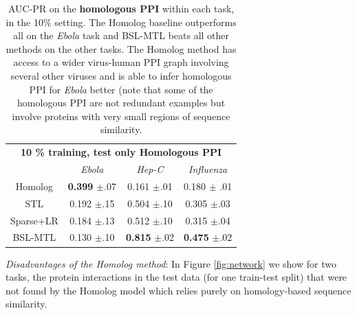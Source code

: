 \documentclass{bioinfo}
\begin{document}
\begin{table}[!h]
\caption{AUC-PR on the \textbf{homologous PPI} within each task, in the 10\% setting. The Homolog baseline outperforms all on the \textit{Ebola} task and BSL-MTL beats all other methods on the other tasks. The Homolog method has access to a wider virus-human PPI graph involving several other viruses and is able to infer homologous PPI for \textit{Ebola} better (note that some of the homologous PPI are not redundant examples but involve proteins with very small regions of sequence similarity.}
\label{homresultsTable}
\begin{small}
\begin{center}
\begin{tabular}{c|ccc}
\toprule
\multicolumn{4}{c}{\textbf{10 \% training, test only Homologous PPI }} \\
& \textit{Ebola} & \textit{Hep-C} & \textit{Influenza} \\ \midrule
Homolog & \textbf{0.399} $\pm$.07 & 0.161 $\pm$.01 & 0.180 $\pm$ .01 \\
STL   & 0.192 $\pm$.15 & 0.504 $\pm$.10 & 0.305 $\pm$.03 \\
Sparse+LR & 0.184 $\pm$.13 & 0.512 $\pm$.10 & 0.315 $\pm$.04 \\ 
BSL-MTL & 0.130 $\pm$.10 & \textbf{0.815} $\pm$.02 & \textbf{0.475} $\pm$.02 \\ \bottomrule
\end{tabular}
\end{center}
\end{small}
\end{table}


\noindent\textit{Disadvantages of the Homolog method}:
In Figure \ref{fig:network} we show for two tasks, the protein interactions in the test data (for one train-test split) that were not found by the Homolog model which relies purely on homology-based sequence similarity. 
\end{document}
